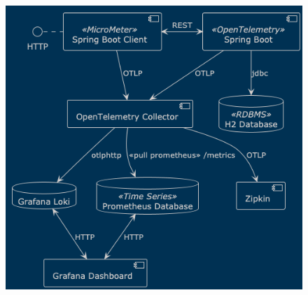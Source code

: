 \documentclass[aspectratio=169]{beamer}
\begin{document}
	\begin{frame}
		
		
		\begin{columns}
			
			\begin{column}{0.5\textwidth}
		\begin{figure}
			\centering
			\includegraphics[width=\linewidth]{Images/otel}
			\label{fig:otel}
		\end{figure}		
			\end{column}
			

\end{columns}
\end{frame}
\end{document}
